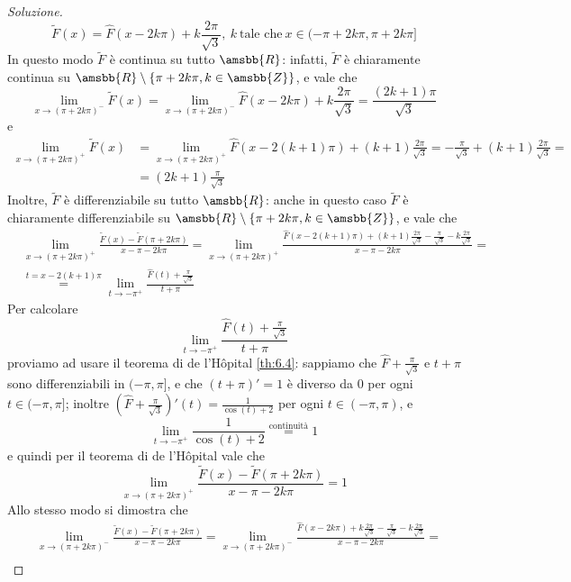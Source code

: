 \begin{proof}[Soluzione]
    \[
    \tilde{F}(x) = \widehat{F}(x-2k\pi)+k\frac{2\pi}{\sqrt{3}}, \ k \ \text{tale che} \ x\in(-\pi +2k\pi, \pi+2k\pi]
    \]
    In questo modo $\tilde{F}$ è continua su tutto $\amsbb{R}$: infatti, $\tilde{F}$ è chiaramente continua su $\amsbb{R}\setminus\{\pi + 2k\pi, k\in\amsbb{Z}\}$, e vale che
    \[
    \lim_{x\to (\pi+2k\pi)^-}\tilde{F}(x) = \lim_{x\to (\pi +2k\pi)^-} \widehat{F}(x-2k\pi) + k\frac{2\pi}{\sqrt{3}} = \frac{(2k+1)\pi}{\sqrt{3}}
    \]
    e
    \[
    \begin{split}
        \lim_{x\to (\pi+2k\pi)^+}\tilde{F}(x) & = \lim_{x\to (\pi +2k\pi)^+} \widehat{F}(x-2(k+1)\pi) + (k+1)\frac{2\pi}{\sqrt{3}} = -\frac{\pi}{\sqrt{3}} +  (k+1)\frac{2\pi}{\sqrt{3}}= \\
        & = (2k+1)\frac{\pi}{\sqrt{3}}
    \end{split}
    \]
    Inoltre, $\tilde{F}$ è differenziabile su tutto $\amsbb{R}$: anche in questo caso $\tilde{F}$ è chiaramente differenziabile su $\amsbb{R}\setminus\{\pi +2k\pi, k\in\amsbb{Z}\}$, e vale che
    \[
    \begin{split}
        &\lim_{x\to (\pi+2k\pi)^+}\frac{\tilde{F}(x)-\tilde{F}(\pi+2k\pi)}{x-\pi -2k\pi}= \lim_{x\to (\pi+2k\pi)^+}\frac{\widehat{F}(x-2(k+1)\pi)+(k+1)\frac{2\pi}{\sqrt{3}}-\frac{\pi}{\sqrt{3}}-k\frac{2\pi}{\sqrt{3}}}{x-\pi -2k\pi} = \\
        & \overset{t=x-2(k+1)\pi}{=} \lim_{t\to-\pi^+}\frac{\widehat{F}(t)+\frac{\pi}{\sqrt{3}}}{t+\pi}
    \end{split}
    \]
    Per calcolare
    \[
    \lim_{t\to-\pi^+}\frac{\widehat{F}(t)+\frac{\pi}{\sqrt{3}}}{t+\pi}
    \]
    proviamo ad usare il teorema di de l'H{\^o}pital \ref{th:6.4}: sappiamo che $\widehat{F}+\frac{\pi}{\sqrt{3}}$ e $t+\pi$ sono differenziabili in $(-\pi, \pi]$, e che $(t+\pi)' = 1$ è diverso da $0$ per ogni $t\in(-\pi, \pi]$; inoltre $(\widehat{F}+\frac{\pi}{\sqrt{3}})'(t) = \frac{1}{\cos(t)+2}$ per ogni $t\in (-\pi, \pi)$, e 
    \[
    \lim_{t\to -\pi^+} \frac{1}{\cos(t)+2} \overset{\text{continuità}}{=} 1
    \]
    e quindi per il teorema di de l'H{\^o}pital vale che
    \[
    \lim_{x\to (\pi+2k\pi)^+}\frac{\tilde{F}(x)-\tilde{F}(\pi+2k\pi)}{x-\pi -2k\pi}=1
    \]
    Allo stesso modo si dimostra che
    \[
    \begin{split}
        &\lim_{x\to (\pi+2k\pi)^-}\frac{\tilde{F}(x)-\tilde{F}(\pi+2k\pi)}{x-\pi -2k\pi}= \lim_{x\to (\pi+2k\pi)^-}\frac{\widehat{F}(x-2k\pi)+k\frac{2\pi}{\sqrt{3}}-\frac{\pi}{\sqrt{3}}-k\frac{2\pi}{\sqrt{3}}}{x-\pi -2k\pi} = \\

\end{split}\]
\end{proof}
